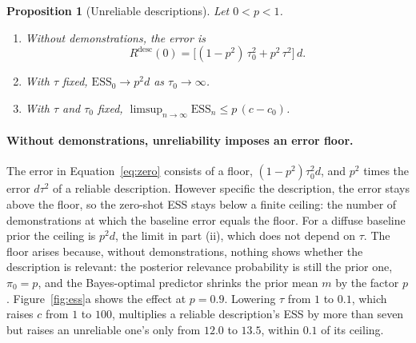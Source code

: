 \documentclass{article}
\newtheorem{proposition}[theorem]{Proposition}
\theoremstyle{definition}
\newcommand{\ess}{\mathrm{ESS}}
\begin{document}
\begin{proposition}[Unreliable descriptions]\label{prop:unreliable}
Let $0<p<1$.
\begin{enumerate}[label=(\roman*),nosep,leftmargin=*]
\item Without demonstrations, the error is
\begin{equation}\label{eq:zero}
R^{\mathrm{desc}}(0)=\big[(1-p^2)\,\tau_0^2+p^2\,\tau^2\big]\,d.
\end{equation}
\item With $\tau$ fixed, $\ess_0\to p^2d$ as $\tau_0\to\infty$.
\item With $\tau$ and $\tau_0$ fixed, $\limsup_{n\to\infty}\ess_n\leq p\,(c-c_0)$.
\end{enumerate}
\end{proposition}

\paragraph{Without demonstrations, unreliability imposes an error floor.}
The error in Equation~\eqref{eq:zero} consists of a floor, $(1-p^2)\tau_0^2d$, and $p^2$ times the error $d\tau^2$ of a reliable description. However specific the description, the error stays above the floor, so the zero-shot ESS stays below a finite ceiling: the number of demonstrations at which the baseline error equals the floor. For a diffuse baseline prior the ceiling is $p^2d$, the limit in part (ii), which does not depend on $\tau$. The floor arises because, without demonstrations, nothing shows whether the description is relevant: the posterior relevance probability is still the prior one, $\pi_0=p$, and the Bayes-optimal predictor shrinks the prior mean $m$ by the factor $p$. Figure~\ref{fig:ess}a shows the effect at $p=0.9$. Lowering $\tau$ from $1$ to $0.1$, which raises $c$ from $1$ to $100$, multiplies a reliable description's ESS by more than seven but raises an unreliable one's only from $12.0$ to $13.5$, within $0.1$ of its ceiling.
\end{document}
